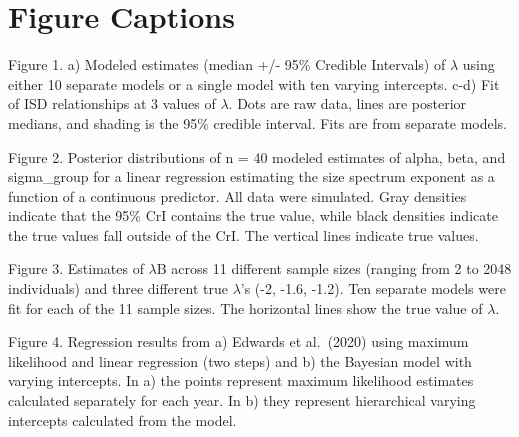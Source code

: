 \documentclass[
  12pt,
]{article}
\begin{document}
\newpage

\hypertarget{figure-captions}{%
\section{Figure Captions}\label{figure-captions}}

Figure 1. a) Modeled estimates (median +/- 95\% Credible Intervals) of
\(\lambda\) using either 10 separate models or a single model with ten
varying intercepts. c-d) Fit of ISD relationships at 3 values of
\(\lambda\). Dots are raw data, lines are posterior medians, and shading
is the 95\% credible interval. Fits are from separate models.

Figure 2. Posterior distributions of n = 40 modeled estimates of alpha,
beta, and sigma\_group for a linear regression estimating the size
spectrum exponent as a function of a continuous predictor. All data were
simulated. Gray densities indicate that the 95\% CrI contains the true
value, while black densities indicate the true values fall outside of
the CrI. The vertical lines indicate true values.

Figure 3. Estimates of \(\lambda\)B across 11 different sample sizes
(ranging from 2 to 2048 individuals) and three different true
\(\lambda\)'s (-2, -1.6, -1.2). Ten separate models were fit for each of
the 11 sample sizes. The horizontal lines show the true value of
\(\lambda\).

Figure 4. Regression results from a) Edwards et al.~(2020) using maximum
likelihood and linear regression (two steps) and b) the Bayesian model
with varying intercepts. In a) the points represent maximum likelihood
estimates calculated separately for each year. In b) they represent
hierarchical varying intercepts calculated from the model.
\end{document}

